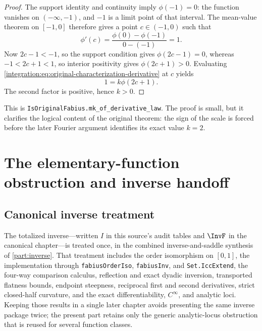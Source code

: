 \documentclass[11pt,oneside]{article}
\theoremstyle{definition}
\theoremstyle{remark}
\newcommand{\lean}[1]{%
  \ifmmode\text{\texttt{\detokenize{#1}}}\else\nolinkurl{#1}\fi}
\begin{document}
\begin{proof}
The support identity and continuity imply $\phi(-1)=0$: the function vanishes on
$(-\infty,-1)$, and $-1$ is a limit point of that interval.  The mean-value theorem on
$[-1,0]$ therefore gives a point $c\in(-1,0)$ such that
\begin{equation}
 \phi'(c)=\frac{\phi(0)-\phi(-1)}{0-(-1)}=1.
 \label{integration:eq:original-characterization-mvt}
\end{equation}
Now $2c-1<-1$, so the support condition gives $\phi(2c-1)=0$, whereas
$-1<2c+1<1$, so interior positivity gives $\phi(2c+1)>0$.  Evaluating
\eqref{integration:eq:original-characterization-derivative} at $c$ yields
\begin{equation}
 1=k\phi(2c+1).
 \label{integration:eq:original-characterization-positive-product}
\end{equation}
The second factor is positive, hence $k>0$.
\end{proof}

This is \lean{IsOriginalFabius.mk\_of\_derivative\_law}.  The proof is small, but it clarifies
the logical content of the original theorem: the sign of the scale is forced before the later
Fourier argument identifies its exact value $k=2$.

\section{The elementary-function obstruction and inverse handoff}

\subsection{Canonical inverse treatment}
\label{integration:sec:inverse}
\label{integration:sec:inverse-steepness}
The totalized inverse---written \(I\) in this source's audit tables and \(\InvF\) in the
canonical chapter---is treated once, in the combined inverse-and-saddle synthesis
of \cref{part:inverse}.  That treatment includes the order isomorphism on \([0,1]\),
the implementation through \nolinkurl{fabiusOrderIso}, \nolinkurl{fabiusInv}, and
\nolinkurl{Set.IccExtend}, the four-way comparison calculus, reflection and exact dyadic
inversion, transported flatness bounds, endpoint steepness, reciprocal first and second
derivatives, strict closed-half curvature, and the exact differentiability,
\(C^\infty\), and analytic loci.  Keeping those results in a single later chapter avoids
presenting the same inverse package twice; the present part retains only the generic
analytic-locus obstruction that is reused for several function classes.
\end{document}

